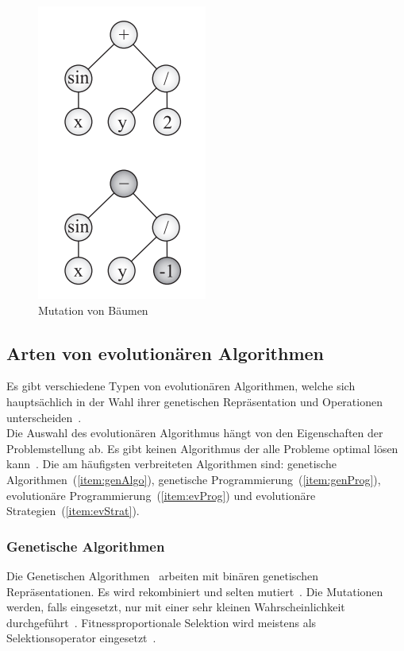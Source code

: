         \begin{figure}[H]
            \includegraphics[scale=0.8,center]{graphics/mutation_tree}
            \caption[\protect{}, S.29]{Mutation von Bäumen\label{fig:MutationTree}}
        \end{figure}

    \subsection{Arten von evolutionären Algorithmen\label{sub:artenEvAlgos}}

      Es gibt verschiedene Typen von evolutionären Algorithmen, welche sich hauptsächlich in der Wahl ihrer
      genetischen Repräsentation und Operationen unterscheiden~\cite{book:introEvComp}.
      \\
      Die Auswahl des evolutionären Algorithmus hängt von den Eigenschaften der Problemstellung ab.
      Es gibt keinen Algorithmus der alle Probleme optimal lösen kann~\cite{book:genAlgoDataStructsEvProg}.
      Die am häufigsten verbreiteten Algorithmen sind: genetische Algorithmen~(\vref{item:genAlgo}),
      genetische Programmierung~(\vref{item:genProg}), evolutionäre Programmierung~(\vref{item:evProg})
      und evolutionäre Strategien~(\vref{item:evStrat}).

      \subsubsection{Genetische Algorithmen\label{item:genAlgo}}

        Die Genetischen Algorithmen~\cite{book:adapNaturalArtSys} arbeiten mit binären genetischen Repräsentationen.
        Es wird rekombiniert und selten mutiert~\cite[S.128]{book:evAlgo}.
        Die Mutationen werden, falls eingesetzt,
        nur mit einer sehr kleinen Wahrscheinlichkeit durchgeführt~\cite[S.128]{book:evAlgo}.
        Fitnessproportionale Selektion wird meistens als Selektionsoperator eingesetzt~\cite[S.128]{book:evAlgo}.

